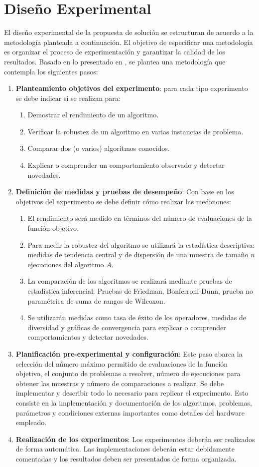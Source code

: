 \section{Diseño Experimental}

El diseño experimental de la propuesta de solución se estructuran de acuerdo a la metodología planteada a continuación. El objetivo  de especificar una metodología es organizar el proceso de experimentación y garantizar la calidad de los resultados. Basado en lo presentado en \cite{BartzBeielstein2014ExperimentalAO}, se plantea una metodología que contempla los siguientes pasos:
\begin{enumerate}
	\item\textbf{ Planteamiento objetivos del experimento}: para cada tipo experimento se debe indicar si se realizan para:
	\begin{enumerate}
		\item Demostrar el rendimiento de un algoritmo.
		\item Verificar la robustez de un algoritmo en varias instancias de problema.
		\item Comparar dos (o varios) algoritmos conocidos.
		\item Explicar o comprender un comportamiento observado y detectar novedades. 
	\end{enumerate}
	\item \textbf{Definición de medidas y pruebas de desempeño}: Con base en los objetivos del experimento se debe definir cómo realizar las mediciones:
	\begin{enumerate}
		\item El rendimiento será medido en términos del número de evaluaciones de la función objetivo.
		\item Para medir la robustez del algoritmo se utilizará la estadística descriptiva: medidas de tendencia central y de dispersión de una muestra de tamaño $n$ ejecuciones del algoritmo $A$.
		\item La comparación de los algoritmos se realizará mediante pruebas de estadística inferencial: Pruebas de Friedman, Bonferroni-Dunn, prueba no paramétrica de suma de rangos de Wilcoxon.
		\item Se utilizarán medidas como tasa de éxito de los operadores, medidas de diversidad y gráficas de convergencia para explicar o comprender comportamientos y detectar novedades.
	\end{enumerate}
	\item \textbf{Planificación pre-experimental y configuración}: Este paso abarca la selección del número máximo permitido de evaluaciones de la función objetivo, el conjunto de problemas a resolver, número de ejecuciones para obtener las muestras y número de comparaciones a realizar. Se debe implementar y describir todo lo necesario para replicar el experimento. Esto consiste en la implementación y documentación de los algoritmos, problemas, parámetros y condiciones externas importantes como detalles del hardware empleado.
	\item \textbf{Realización de los experimentos}: Los experimentos deberán ser realizados de forma automática. Las implementaciones deberán estar debidamente comentadas y los resultados deben ser presentados de forma organizada.
	

\end{enumerate}
